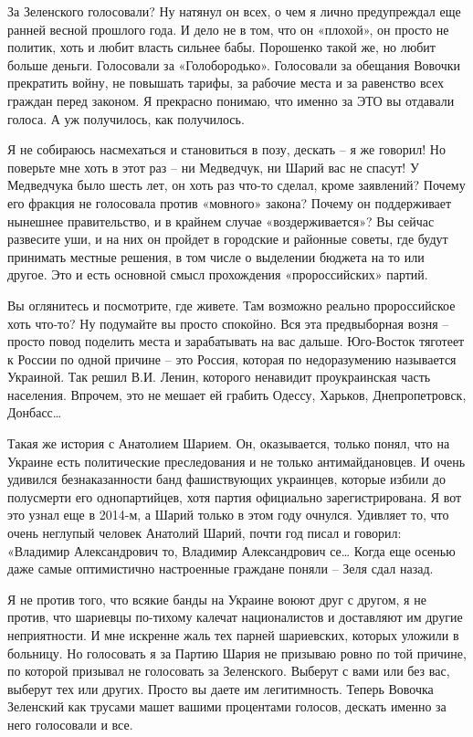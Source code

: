 За Зеленского голосовали? Ну натянул он всех, о чем я лично предупреждал еще ранней весной прошлого года. И дело не в том, что он «плохой», он просто не политик, хоть и любит власть сильнее бабы. Порошенко такой же, но любит больше деньги. Голосовали за «Голобородько». Голосовали за обещания Вовочки прекратить войну, не повышать тарифы, за рабочие места и за равенство всех граждан перед законом. Я прекрасно понимаю, что именно за ЭТО вы отдавали голоса. А уж получилось, как получилось.

Я не собираюсь насмехаться и становиться в позу, дескать – я же говорил! Но поверьте мне хоть в этот раз – ни Медведчук, ни Шарий вас не спасут! У Медведчука было шесть лет, он хоть раз что-то сделал, кроме заявлений? Почему его фракция не голосовала против «мовного» закона? Почему он поддерживает нынешнее правительство, и в крайнем случае «воздерживается»? Вы сейчас развесите уши, и на них он пройдет в городские и районные советы, где будут принимать местные решения, в том числе о выделении бюджета на то или другое. Это и есть основной смысл прохождения «пророссийских» партий.

Вы оглянитесь и посмотрите, где живете. Там возможно реально пророссийское хоть что-то? Ну подумайте вы просто спокойно. Вся эта предвыборная возня – просто повод поделить места и зарабатывать на вас дальше. Юго-Восток тяготеет к России по одной причине – это Россия, которая по недоразумению называется Украиной. Так решил В.И. Ленин, которого ненавидит проукраинская часть населения. Впрочем, это не мешает ей грабить Одессу, Харьков, Днепропетровск, Донбасс…

Такая же история с Анатолием Шарием. Он, оказывается, только понял, что на Украине есть политические преследования и не только антимайдановцев. И очень удивился безнаказанности банд фашиствующих украинцев, которые избили до полусмерти его однопартийцев, хотя партия официально зарегистрирована. Я вот это узнал еще в 2014-м, а Шарий только в этом году очнулся. Удивляет то, что очень неглупый человек Анатолий Шарий, почти год писал и говорил: «Владимир Александрович то, Владимир Александрович се… Когда еще осенью даже самые оптимистично настроенные граждане поняли – Зеля сдал назад.

Я не против того, что всякие банды на Украине воюют друг с другом, я не против, что шариевцы по-тихому калечат националистов и доставляют им другие неприятности. И мне искренне жаль тех парней шариевских, которых уложили в больницу. Но голосовать я за Партию Шария не призываю ровно по той причине, по которой призывал не голосовать за Зеленского. Выберут с вами или без вас, выберут тех или других. Просто вы даете им легитимность. Теперь Вовочка Зеленский как трусами машет вашими процентами голосов, дескать именно за него голосовали и все.

